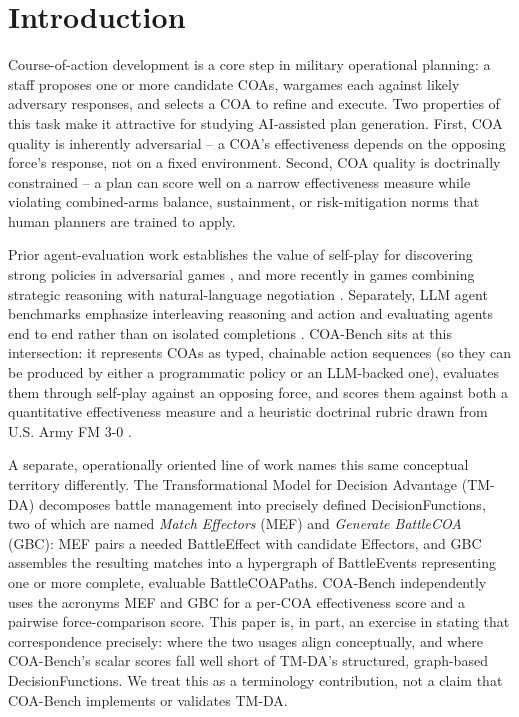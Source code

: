 \documentclass[letterpaper]{article} %
\begin{document}

\section{Introduction}

Course-of-action development is a core step in military operational planning: a staff proposes one or more candidate COAs, wargames each against likely adversary responses, and selects a COA to refine and execute. Two properties of this task make it attractive for studying AI-assisted plan generation. First, COA quality is inherently adversarial -- a COA's effectiveness depends on the opposing force's response, not on a fixed environment. Second, COA quality is doctrinally constrained -- a plan can score well on a narrow effectiveness measure while violating combined-arms balance, sustainment, or risk-mitigation norms that human planners are trained to apply.

Prior agent-evaluation work establishes the value of self-play for discovering strong policies in adversarial games \citep{silver2018alphazero,vinyals2019alphastar,brown2019superhuman}, and more recently in games combining strategic reasoning with natural-language negotiation \citep{bakhtin2022cicero}. Separately, LLM agent benchmarks emphasize interleaving reasoning and action \citep{yao2023react} and evaluating agents end to end rather than on isolated completions \citep{liu2024agentbench}. COA-Bench sits at this intersection: it represents COAs as typed, chainable action sequences (so they can be produced by either a programmatic policy or an LLM-backed one), evaluates them through self-play against an opposing force, and scores them against both a quantitative effectiveness measure and a heuristic doctrinal rubric drawn from U.S. Army FM 3-0 \citep{fm30}.

A separate, operationally oriented line of work names this same conceptual territory differently. The Transformational Model for Decision Advantage (TM-DA) \citep{tmda2025bootcamp} decomposes battle management into precisely defined DecisionFunctions, two of which are named \emph{Match Effectors} (MEF) and \emph{Generate BattleCOA} (GBC): MEF pairs a needed BattleEffect with candidate Effectors, and GBC assembles the resulting matches into a hypergraph of BattleEvents representing one or more complete, evaluable BattleCOAPaths. COA-Bench independently uses the acronyms MEF and GBC for a per-COA effectiveness score and a pairwise force-comparison score. This paper is, in part, an exercise in stating that correspondence precisely: where the two usages align conceptually, and where COA-Bench's scalar scores fall well short of TM-DA's structured, graph-based DecisionFunctions. We treat this as a terminology contribution, not a claim that COA-Bench implements or validates TM-DA.
\end{document}
